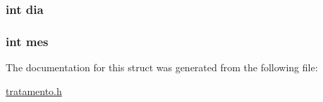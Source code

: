 \subsubsection[{dia}]{\setlength{\rightskip}{0pt plus 5cm}int dia}\label{structdisponibilidade_num_a3d1171ac670a8e8a672c481f22d1fa9f}
\hypertarget{structdisponibilidade_num_a9fc86758220eae0e735655f81fd9d9bc}{}
\subsubsection[{mes}]{\setlength{\rightskip}{0pt plus 5cm}int mes}\label{structdisponibilidade_num_a9fc86758220eae0e735655f81fd9d9bc}


The documentation for this struct was generated from the following file\+:\begin{DoxyCompactItemize}
\item 
\hyperlink{tratamento_8h}{tratamento.\+h}\end{DoxyCompactItemize}
